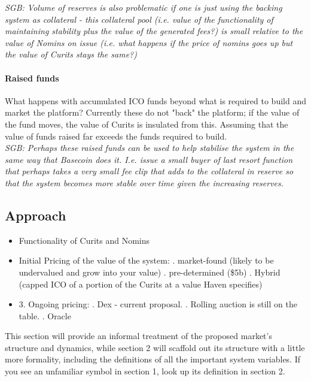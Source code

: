\noindent \textit{SGB: Volume of reserves is also problematic if one is just using the backing system as collateral - this collateral pool (i.e. value of the functionality of maintaining stability plus the value of the generated fees?) is small relative to the value of Nomins on issue (i.e. what happens if the price of nomins goes up but the value of Curits stays the same?)} \\

\paragraph{Raised funds}

What happens with accumulated ICO funds beyond what is required to build and market the platform? Currently these do not "back" the platform; if the value of the fund moves, the value of Curits is insulated from this. Assuming that the value of funds raised far exceeds the funds required to build. \\

\noindent \textit{SGB: Perhaps these raised funds can be used to help stabilise the system in the same way that Basecoin does it. I.e. issue a small buyer of last resort function that perhaps takes a very small fee clip that adds to the collateral in reserve so that the system becomes more stable over time given the increasing reserves.}

\subsection{Approach}

\begin{itemize}
	\item Functionality of Curits and Nomins
	\item Initial Pricing of the value of the system:
		. market-found (likely to be undervalued and grow into your value)
		. pre-determined (\$5b)
		. Hybrid (capped ICO of a portion of the Curits at a value Haven specifies)
	\item 3. Ongoing pricing:
		. Dex - current proposal.
		. Rolling auction is still on the table.
		. Oracle
\end{itemize}

This section will provide an informal treatment of the proposed market's structure and dynamics, while section 2 will scaffold out its structure with a little more formality, including the definitions of all the important system variables. If you see an unfamiliar symbol in section 1, look up its definition in section 2.


